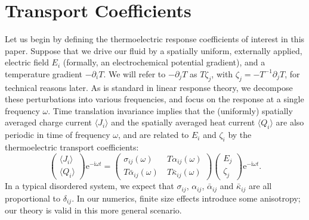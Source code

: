 \section{Transport Coefficients}\label{section:AL_sectransco}
Let us begin by defining the thermoelectric response coefficients of interest in this paper.   Suppose that we drive our fluid by a spatially uniform, externally applied, electric field $ E_i$ (formally, an electrochemical potential gradient), and a temperature gradient $-\partial_i T$.  We will refer to $-\partial_j T$ as $T\zeta_j$, with $\zeta_j = -T^{-1}\partial_j T$, for technical reasons later.   As is standard in linear response theory, we decompose these perturbations into various frequencies, and focus on the response at a single frequency $\omega$.   Time translation invariance implies that the (uniformly) spatially averaged charge current $\langle  J_i \rangle$ and the spatially averaged heat current $\langle  Q_i \rangle$ are also periodic in time of frequency $\omega$, and are related to $ E_i$ and $ \zeta_i$ by the thermoelectric transport coefficients: \begin{equation}
\left( \begin{array}{c} \langle  J_i \rangle  \\ \langle  Q_i\rangle \end{array}\right) \mathrm{e}^{-\mathrm{i}\omega t} =  \left( \begin{array}{cc} \sigma_{ij}(\omega)   &\  T\alpha_{ij}(\omega) \\  T\bar\alpha_{ij}(\omega)   &\ T\bar\kappa_{ij}(\omega)  \end{array}\right)\left( \begin{array}{c}  E_j \\  \zeta_j  \end{array}\right) \mathrm{e}^{-\mathrm{i}\omega t}.   \label{eq:AL_transeq}
\end{equation}
 In a typical disordered system, we expect that $\sigma_{ij}$, $\alpha_{ij}$, $\bar\alpha_{ij}$ and $\bar\kappa_{ij}$ are all proportional to $\delta_{ij}$.   In our numerics, finite size effects introduce some anisotropy; our theory is valid in this more general scenario.

